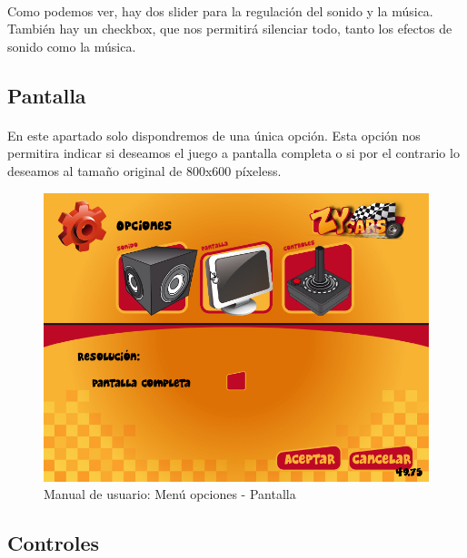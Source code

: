 \paragraph{}
Como podemos ver, hay dos slider para la regulación del sonido y la música. También hay un checkbox, que nos permitirá silenciar todo, tanto 
los efectos de sonido como la música.

\subsection{Pantalla}

\paragraph{}
En este apartado solo dispondremos de una única opción. Esta opción nos permitira indicar si deseamos el juego a pantalla 
completa o si por el contrario lo deseamos al tamaño original de 800x600 píxeless.

\begin{figure}[H]
  \label{menu_pantalla}
  \begin{center}
    \includegraphics[scale=0.4]{imagenes/capturas/menuopcionespantalla.png}
  \end{center}
 \caption{Manual de usuario: Menú opciones - Pantalla}
\end{figure}

\subsection{Controles}

